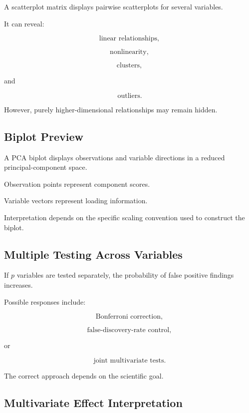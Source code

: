 A scatterplot matrix displays pairwise scatterplots for several
variables.

It can reveal:

\[
\boxed{
\text{linear relationships},
}
\]

\[
\boxed{
\text{nonlinearity},
}
\]

\[
\boxed{
\text{clusters},
}
\]

and

\[
\boxed{
\text{outliers}.
}
\]

However, purely higher-dimensional relationships may remain hidden.

\subsection{Biplot Preview}
\label{subsec:pca-biplot}

A PCA biplot displays observations and variable directions in a reduced
principal-component space.

Observation points represent component scores.

Variable vectors represent loading information.

Interpretation depends on the specific scaling convention used to
construct the biplot.

\subsection{Multiple Testing Across Variables}
\label{subsec:multivariate-multiple-testing}

If \(p\) variables are tested separately, the probability of false
positive findings increases.

Possible responses include:

\[
\boxed{
\text{Bonferroni correction},
}
\]

\[
\boxed{
\text{false-discovery-rate control},
}
\]

or

\[
\boxed{
\text{joint multivariate tests}.
}
\]

The correct approach depends on the scientific goal.

\subsection{Multivariate Effect Interpretation}
\label{subsec:multivariate-effect-interpretation}


